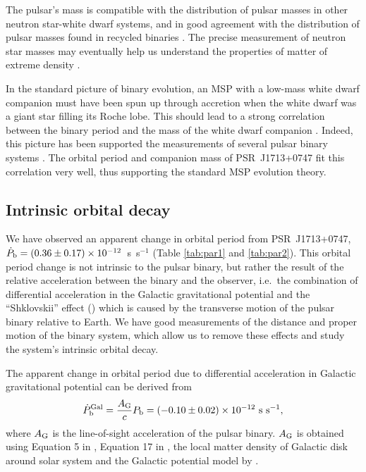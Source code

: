 The pulsar's mass is compatible with the distribution of pulsar masses
in other neutron star-white dwarf systems, and in good
agreement with the distribution of pulsar masses found in recycled binaries
\citep{opns12,kkdt13}. The precise measurement of neutron star masses 
may eventually help us understand the properties of matter of extreme 
density \citep{dpr+10, lat12, afw+13}.

In the standard picture of binary evolution, an MSP with a low-mass white dwarf companion must have been spun up through accretion when the white dwarf was a giant star filling its Roche lobe. 
This should lead to a strong correlation between the binary period and the mass of the white dwarf companion \citep{rpj+95, ts99a, prp02b}. 
Indeed, this picture has been supported the measurements of several pulsar
binary systems \citep[e.g.][]{vbb+01, ktr94, th14, rsa+14}.  
The orbital period and companion mass of PSR~J1713+0747 fit
this correlation very well, thus supporting the standard MSP evolution theory. 


\subsection{Intrinsic orbital decay}
\label{sec:obdecay}
We have observed an apparent change in orbital period from PSR~J1713+0747, $\dot{P}_{\rm b} =
(0.36\pm0.17)\times10^{-12}$~s~s$^{-1}$ (Table \ref{tab:par1} and \ref{tab:par2}).
This orbital period change is not intrinsic to the pulsar binary, but rather the
result of the relative acceleration between the binary and the
observer, i.e.~the combination of differential acceleration in the Galactic gravitational potential
\citep{dt91} and the ``Shklovskii'' effect (\citealt{shk70}) which is caused
by the transverse motion of the pulsar binary relative to Earth. We have good measurements of the distance and proper
motion of the binary system, which allow us to remove these effects and study the system's intrinsic orbital decay.

The apparent change in orbital period due to differential acceleration in
Galactic gravitational potential can be derived from
\begin{equation}
\dot{P}_{\rm b}^{\rm Gal} = \frac{A_{\rm G}}{c} P_{\rm b} =
(-0.10\pm0.02)\times10^{-12}~{\rm s~s^{-1}},
\end{equation}
where $A_{\rm G}$ is the line-of-sight acceleration of the pulsar binary.
$A_{\rm G}$ is obtained using
Equation 5 in \citet{nt95}, Equation 17 in \citet{lwj+09}, the
local matter density of Galactic disk around solar system \citep{hf04a}
and the Galactic potential model by \citet{rmb+14}.

